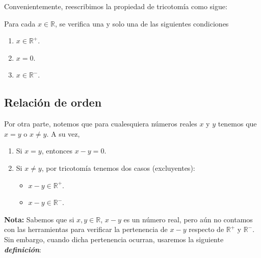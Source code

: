 \documentclass[11pt]{article}
\newcommand{\R}{\mathbb{R}}
\newcommand{\bfit}[1]{\textbf{\textit{#1}}}
\begin{document}
Convenientemente, reescribimos la propiedad de tricotomía como sigue:

Para cada $x\in \R$, se verifica una y solo una de las siguientes condiciones\vspace{-1em} \begin{enumerate}[label=\roman*)]
    \item $x\in \R^+$.
    \item $x=0$.
    \item $x\in \R^-$.
\end{enumerate}\vspace{-1em}
%

\subsection*{Relación de orden}

Por otra parte, notemos que para cualesquiera números reales $x$ y $y$ tenemos que $x=y$ o $x\neq y$. A su vez, \vspace{-1em}\begin{enumerate}[label=\roman*)]
\item Si $x=y$, entonces $x-y=0$.
\item Si $x\neq y$, por tricotomía tenemos dos casos (excluyentes):\begin{itemize}
    \item $x-y\in \R^+$.
    \item $x-y\in \R^-$.
\end{itemize}%
\end{enumerate}\vspace{-1em}
\textbf{Nota:} Sabemos que si $x,y\in \R$, $x-y$ es un número real, pero aún no contamos con las herramientas para verificar la pertenencia de $x-y$ respecto de $\R^+$ y $\R^-$. Sin embargo, cuando dicha pertenencia ocurran, usaremos la siguiente \bfit{definición}:
\end{document}
